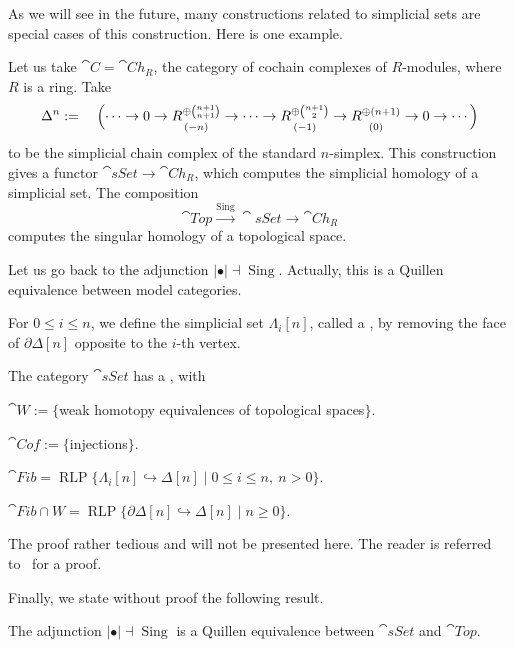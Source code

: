 As we will see in the future,
many constructions related to simplicial sets are special cases of this construction.
Here is one example.

\begin{example}
    Let us take $\cat{C}=\cat{Ch}_R$, the category of cochain complexes of $R$-modules,
    where $R$ is a ring. Take
    \[\Delta^n:=\quad\Bigl(\cdots\to0\to
    \underset{(-n)}{R^{\oplus\binom{n+1}{n+1}}}\to
    \cdots\to
    \underset{(-1)}{R^{\oplus\binom{n+1}{2}}}\to
    \underset{(0)}{R^{\oplus(n+1)}}\to0\to\cdots\Bigr)\]
    to be the simplicial chain complex of the standard $n$-simplex.
    This construction gives a functor $\cat{sSet}\to\cat{Ch}_R$,
    which computes the simplicial homology of a simplicial set.
    The composition
    \[\cat{Top}\xrightarrow{\operatorname{Sing}}\cat{sSet}\to\cat{Ch}_R\]
    computes the singular homology of a topological space. \varqed
\end{example}

Let us go back to the adjunction $|{\bullet}|\dashv\operatorname{Sing}$.
Actually, this is a Quillen equivalence between model categories.

For $0\leq i\leq n$, we define the simplicial set $\Lambda_i[n]$, called a ,
by removing the face of $\partial\Delta[n]$ opposite to the $i$-th vertex.

\begin{theorem}
    The category $\cat{sSet}$ has a , with
    \begin{itms}
        \item $\cat W:=\{$weak homotopy equivalences of topological spaces$\}$.
        \item $\cat{Cof}:=\{$injections$\}$.
        \item $\cat{Fib}=\operatorname{RLP}\{\Lambda_i[n]\hookrightarrow\Delta[n]\mid0\leq i\leq n,\ n>0\}$.
        \item $\cat{Fib\cap W}=\operatorname{RLP}\{\partial\Delta[n]\hookrightarrow\Delta[n]\mid n\geq0\}$.
    \end{itms}
\end{theorem}

The proof rather tedious and will not be presented here.
The reader is referred to~\cite[Theorem~3.6.5]{hovey} for a proof.

Finally, we state without proof the following result.

\begin{theorem}
    The adjunction $|{\bullet}|\dashv\operatorname{Sing}$
    is a Quillen equivalence between $\cat{sSet}$ and $\cat{Top}$.
\end{theorem}

